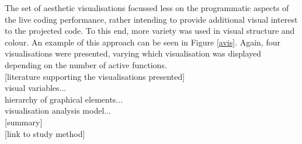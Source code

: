 \documentclass{article}
\begin{document}
The set of aesthetic visualisations focussed less on the programmatic aspects of the live coding performance, rather intending to provide additional visual interest to the projected code. To this end, more variety was used in visual structure and colour. An example of this approach can be seen in Figure \ref{avis}. Again, four visualisations were presented, varying which visualisation was displayed depending on the number of active functions.\\

[literature supporting the visualisations presented]\\

visual variables...\\

hierarchy of graphical elements...\\

visualisation analysis model...\\

[summary]\\

[link to study method]\\
\end{document}
